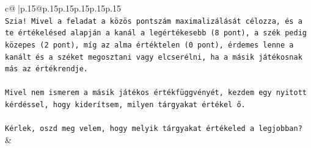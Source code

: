 \documentclass{article}
\begin{document}
{\begin{supertabular}{c@{$\;$}|p{.15\linewidth}@{}p{.15\linewidth}p{.15\linewidth}p{.15\linewidth}p{.15\linewidth}p{.15\linewidth}}
{{{\\ 
\texttt{Szia! Mivel a feladat a közös pontszám maximalizálását célozza, és a te értékelésed alapján a kanál a legértékesebb (8 pont), a szék pedig közepes (2 pont), míg az alma értéktelen (0 pont), érdemes lenne a kanált és a széket megosztani vagy elcserélni, ha a másik játékosnak más az értékrendje.} \\
\\ 
\texttt{Mivel nem ismerem a másik játékos értékfüggvényét, kezdem egy nyitott kérdéssel, hogy kiderítsem, milyen tárgyakat értékel ő.} \\
\\ 
\texttt{Kérlek, oszd meg velem, hogy melyik tárgyakat értékeled a legjobban?} \\
            }
        }
    }
    & \\ \\


\end{supertabular}}
\end{document}
